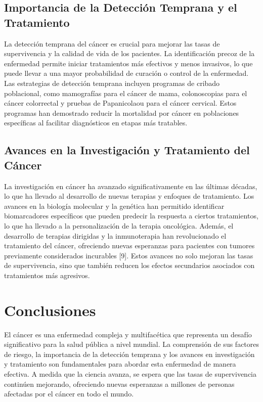 \subsection{Importancia de la Detección Temprana y el Tratamiento}
\label{sec:importance-early-detection}
La detección temprana del cáncer es crucial para mejorar las tasas de supervivencia y la calidad de vida de los pacientes. La identificación precoz de la enfermedad permite iniciar tratamientos más efectivos y menos invasivos, lo que puede llevar a una mayor probabilidad de curación o control de la enfermedad. Las estrategias de detección temprana incluyen programas de cribado poblacional, como mamografías para el cáncer de mama, colonoscopias para el cáncer colorrectal y pruebas de Papanicolaou para el cáncer cervical. Estos programas han demostrado reducir la mortalidad por cáncer en poblaciones específicas al facilitar diagnósticos en etapas más tratables\cite{usptf2023cancer}.
\subsection{Avances en la Investigación y Tratamiento del Cáncer}
\label{sec:advances-cancer-research}          
La investigación en cáncer ha avanzado significativamente en las últimas décadas, lo que ha llevado al desarrollo de nuevas terapias y enfoques de tratamiento. Los avances en la biología molecular y la genética han permitido identificar biomarcadores específicos que pueden predecir la respuesta a ciertos tratamientos, lo que ha llevado a la personalización de la terapia oncológica. Además, el desarrollo de terapias dirigidas y la inmunoterapia han revolucionado el tratamiento del cáncer, ofreciendo nuevas esperanzas para pacientes con tumores previamente considerados incurables [9]. Estos avances no solo mejoran las tasas de supervivencia, sino que también reducen los efectos secundarios asociados con tratamientos más agresivos.

\section{Conclusiones}
El cáncer es una enfermedad compleja y multifacética que representa un desafío significativo para la salud pública a nivel mundial. La comprensión de sus factores de riesgo, la importancia de la detección temprana y los avances en investigación y tratamiento son fundamentales para abordar esta enfermedad de manera efectiva. A medida que la ciencia avanza, se espera que las tasas de supervivencia continúen mejorando, ofreciendo nuevas esperanzas a millones de personas afectadas por el cáncer en todo el mundo.

